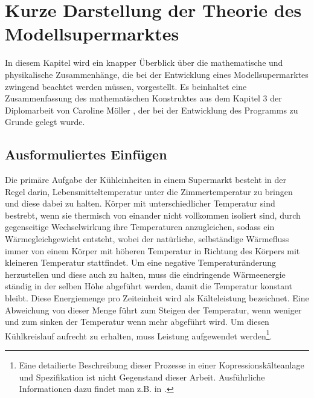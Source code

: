\chapter{Kurze Darstellung der Theorie des Modellsupermarktes}
\label{chap:theorie}
\minitoc
In diesem Kapitel wird ein knapper Überblick über die mathematische und physikalische Zusammenhänge, die bei der Entwicklung eines
Modellsupermarktes zwingend beachtet werden müssen, vorgestellt. Es beinhaltet eine
Zusammenfassung des mathematischen Konstruktes aus dem Kapitel 3 der Diplomarbeit von Caroline Möller \cite{caro}, der bei der
Entwicklung des Programms zu Grunde gelegt wurde.

\section{Ausformuliertes Einfügen}

Die primäre Aufgabe der Kühleinheiten in einem Supermarkt besteht in der Regel darin, Lebensmitteltemperatur unter die
Zimmertemperatur zu bringen und diese dabei zu halten. Körper mit unterschiedlicher Temperatur
sind bestrebt, wenn sie thermisch von einander nicht vollkommen isoliert sind, durch gegenseitige Wechselwirkung ihre
Temperaturen anzugleichen, sodass ein Wärmegleichgewicht entsteht, wobei der natürliche, selbständige Wärmefluss immer von
einem Körper mit höheren Temperatur in Richtung des Körpers mit kleineren Temperatur stattfindet. Um eine negative
Temperaturänderung herzustellen und diese auch zu halten, muss die eindringende Wärmeenergie ständig in der selben Höhe
abgeführt werden, damit die Temperatur konstant bleibt. Diese Energiemenge pro Zeiteinheit wird als Kälteleistung bezeichnet.
Eine Abweichung von dieser Menge führt zum Steigen der Temperatur, wenn weniger und zum sinken der Temperatur wenn mehr
abgeführt wird. Um diesen Kühlkreislauf aufrecht zu erhalten, muss Leistung aufgewendet werden\footnote{ Eine detailierte
Beschreibung dieser Prozesse in einer Kopressionskälteanlage und Spezifikation ist nicht Gegenstand dieser Arbeit.
Ausführliche Informationen dazu findet man z.B.  in \cite{caro, doctor, TAB_A1}.}.


